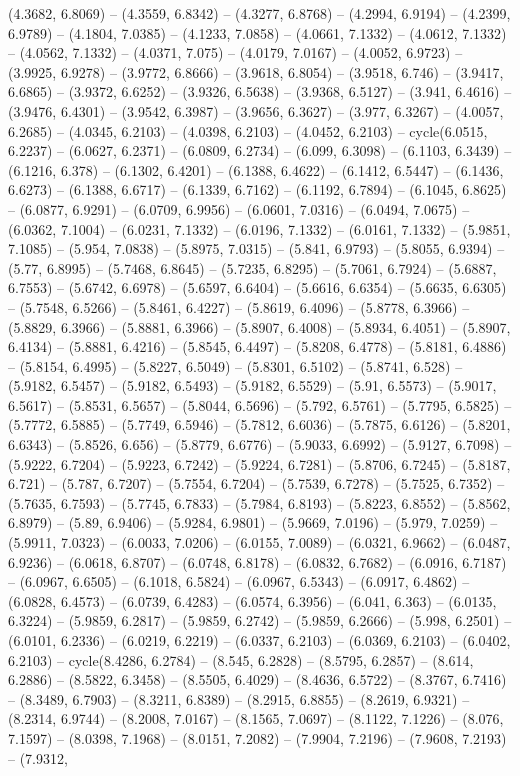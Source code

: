 (4.3682, 6.8069) -- (4.3559, 6.8342) -- (4.3277, 6.8768) -- (4.2994, 6.9194) -- (4.2399, 6.9789) -- (4.1804, 7.0385) -- (4.1233, 7.0858) -- (4.0661, 7.1332) -- (4.0612, 7.1332) -- (4.0562, 7.1332) -- (4.0371, 7.075) -- (4.0179, 7.0167) -- (4.0052, 6.9723) -- (3.9925, 6.9278) -- (3.9772, 6.8666) -- (3.9618, 6.8054) -- (3.9518, 6.746) -- (3.9417, 6.6865) -- (3.9372, 6.6252) -- (3.9326, 6.5638) -- (3.9368, 6.5127) -- (3.941, 6.4616) -- (3.9476, 6.4301) -- (3.9542, 6.3987) -- (3.9656, 6.3627) -- (3.977, 6.3267) -- (4.0057, 6.2685) -- (4.0345, 6.2103) -- (4.0398, 6.2103) -- (4.0452, 6.2103) -- cycle(6.0515, 6.2237) -- (6.0627, 6.2371) -- (6.0809, 6.2734) -- (6.099, 6.3098) -- (6.1103, 6.3439) -- (6.1216, 6.378) -- (6.1302, 6.4201) -- (6.1388, 6.4622) -- (6.1412, 6.5447) -- (6.1436, 6.6273) -- (6.1388, 6.6717) -- (6.1339, 6.7162) -- (6.1192, 6.7894) -- (6.1045, 6.8625) -- (6.0877, 6.9291) -- (6.0709, 6.9956) -- (6.0601, 7.0316) -- (6.0494, 7.0675) -- (6.0362, 7.1004) -- (6.0231, 7.1332) -- (6.0196, 7.1332) -- (6.0161, 7.1332) -- (5.9851, 7.1085) -- (5.954, 7.0838) -- (5.8975, 7.0315) -- (5.841, 6.9793) -- (5.8055, 6.9394) -- (5.77, 6.8995) -- (5.7468, 6.8645) -- (5.7235, 6.8295) -- (5.7061, 6.7924) -- (5.6887, 6.7553) -- (5.6742, 6.6978) -- (5.6597, 6.6404) -- (5.6616, 6.6354) -- (5.6635, 6.6305) -- (5.7548, 6.5266) -- (5.8461, 6.4227) -- (5.8619, 6.4096) -- (5.8778, 6.3966) -- (5.8829, 6.3966) -- (5.8881, 6.3966) -- (5.8907, 6.4008) -- (5.8934, 6.4051) -- (5.8907, 6.4134) -- (5.8881, 6.4216) -- (5.8545, 6.4497) -- (5.8208, 6.4778) -- (5.8181, 6.4886) -- (5.8154, 6.4995) -- (5.8227, 6.5049) -- (5.8301, 6.5102) -- (5.8741, 6.528) -- (5.9182, 6.5457) -- (5.9182, 6.5493) -- (5.9182, 6.5529) -- (5.91, 6.5573) -- (5.9017, 6.5617) -- (5.8531, 6.5657) -- (5.8044, 6.5696) -- (5.792, 6.5761) -- (5.7795, 6.5825) -- (5.7772, 6.5885) -- (5.7749, 6.5946) -- (5.7812, 6.6036) -- (5.7875, 6.6126) -- (5.8201, 6.6343) -- (5.8526, 6.656) -- (5.8779, 6.6776) -- (5.9033, 6.6992) -- (5.9127, 6.7098) -- (5.9222, 6.7204) -- (5.9223, 6.7242) -- (5.9224, 6.7281) -- (5.8706, 6.7245) -- (5.8187, 6.721) -- (5.787, 6.7207) -- (5.7554, 6.7204) -- (5.7539, 6.7278) -- (5.7525, 6.7352) -- (5.7635, 6.7593) -- (5.7745, 6.7833) -- (5.7984, 6.8193) -- (5.8223, 6.8552) -- (5.8562, 6.8979) -- (5.89, 6.9406) -- (5.9284, 6.9801) -- (5.9669, 7.0196) -- (5.979, 7.0259) -- (5.9911, 7.0323) -- (6.0033, 7.0206) -- (6.0155, 7.0089) -- (6.0321, 6.9662) -- (6.0487, 6.9236) -- (6.0618, 6.8707) -- (6.0748, 6.8178) -- (6.0832, 6.7682) -- (6.0916, 6.7187) -- (6.0967, 6.6505) -- (6.1018, 6.5824) -- (6.0967, 6.5343) -- (6.0917, 6.4862) -- (6.0828, 6.4573) -- (6.0739, 6.4283) -- (6.0574, 6.3956) -- (6.041, 6.363) -- (6.0135, 6.3224) -- (5.9859, 6.2817) -- (5.9859, 6.2742) -- (5.9859, 6.2666) -- (5.998, 6.2501) -- (6.0101, 6.2336) -- (6.0219, 6.2219) -- (6.0337, 6.2103) -- (6.0369, 6.2103) -- (6.0402, 6.2103) -- cycle(8.4286, 6.2784) -- (8.545, 6.2828) -- (8.5795, 6.2857) -- (8.614, 6.2886) -- (8.5822, 6.3458) -- (8.5505, 6.4029) -- (8.4636, 6.5722) -- (8.3767, 6.7416) -- (8.3489, 6.7903) -- (8.3211, 6.8389) -- (8.2915, 6.8855) -- (8.2619, 6.9321) -- (8.2314, 6.9744) -- (8.2008, 7.0167) -- (8.1565, 7.0697) -- (8.1122, 7.1226) -- (8.076, 7.1597) -- (8.0398, 7.1968) -- (8.0151, 7.2082) -- (7.9904, 7.2196) -- (7.9608, 7.2193) -- (7.9312, 